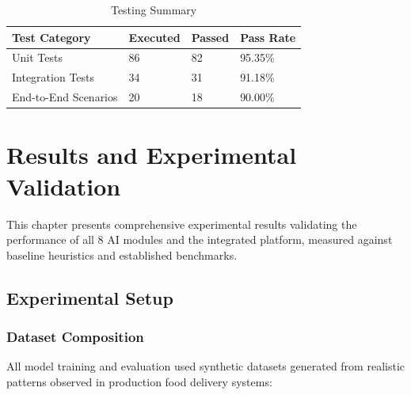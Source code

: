 \documentclass[12pt,a4paper]{report}
\begin{document}
\begin{itemize}
\begin{table}[h!]
\centering
\caption{Testing Summary}
\begin{tabular}{p{4cm} p{3cm} p{3cm} p{3cm}}
\toprule
\textbf{Test Category} & \textbf{Executed} & \textbf{Passed} & \textbf{Pass Rate} \\
\midrule
Unit Tests & 86 & 82 & 95.35\% \\
Integration Tests & 34 & 31 & 91.18\% \\
End-to-End Scenarios & 20 & 18 & 90.00\% \\
\bottomrule
\end{tabular}
\end{table}

\chapter{Results and Experimental Validation}

This chapter presents comprehensive experimental results validating the performance of all 8 AI modules and the integrated platform, measured against baseline heuristics and established benchmarks.

\section{Experimental Setup}

\subsection{Dataset Composition}

All model training and evaluation used synthetic datasets generated from realistic patterns observed in production food delivery systems:


\end{itemize}
\end{document}
